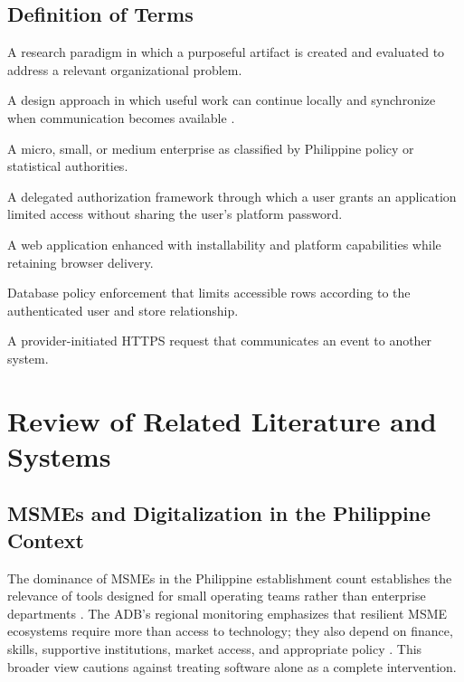 \documentclass[12pt,oneside]{report}
\begin{document}
\section{Definition of Terms}
\begin{description}[style=nextline,leftmargin=0.3in]
  \item[Design science research.] A research paradigm in which a purposeful
  artifact is created and evaluated to address a relevant organizational
  problem.
  \item[Local-first or offline-capable.] A design approach in which useful work
  can continue locally and synchronize when communication becomes available
  \parencite{kleppmann2019localfirst}.
  \item[MSME.] A micro, small, or medium enterprise as classified by Philippine
  policy or statistical authorities.
  \item[OAuth.] A delegated authorization framework through which a user grants
  an application limited access without sharing the user's platform password.
  \item[Progressive web application (PWA).] A web application enhanced with
  installability and platform capabilities while retaining browser delivery.
  \item[Row-level security (RLS).] Database policy enforcement that limits
  accessible rows according to the authenticated user and store relationship.
  \item[Webhook.] A provider-initiated HTTPS request that communicates an event
  to another system.
\end{description}

\chapter{Review of Related Literature and Systems}

\section{MSMEs and Digitalization in the Philippine Context}
The dominance of MSMEs in the Philippine establishment count establishes the
relevance of tools designed for small operating teams rather than enterprise
departments \parencite{dti2024msme}. The ADB's regional monitoring emphasizes
that resilient MSME ecosystems require more than access to technology; they
also depend on finance, skills, supportive institutions, market access, and
appropriate policy \parencite{adb2024monitor}. This broader view cautions
against treating software alone as a complete intervention.
\end{document}
